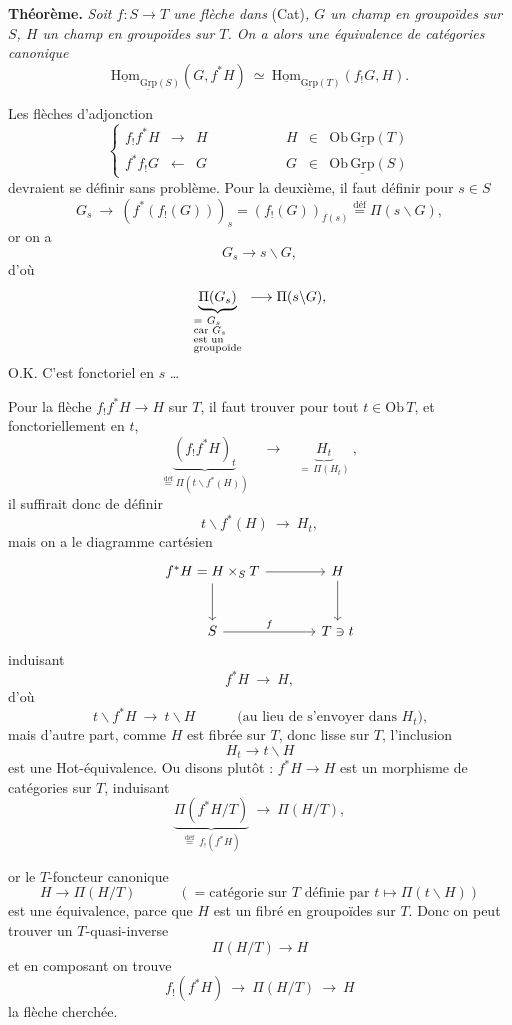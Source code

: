 \documentclass[11pt]{article}
\newcommand{\printedpage}[1]{\marginpar{\footnotesize p.~#1}}
\newcommand{\msp}[1]{\marginpar{\footnotesize [#1]}}
\newcommand{\uHom}{\underline{\mathrm{Hom}}}
\newcommand{\uGrp}{\underline{\mathrm{Grp}}}
\newcommand{\fl}{\longrightarrow}
\begin{document}
\printedpage{4}

\textbf{Théorème.} \textit{Soit $f : S \fl T$ une flèche dans} (Cat)\textit{, $G$ un champ en groupoïdes sur $S$, $H$ un champ en groupoïdes sur $T$. On a alors une équivalence de catégories canonique}
\[
\boxed{\ \uHom_{\uGrp(S)}(G, f^*H) \ \simeq\ \uHom_{\uGrp(T)}(f_!G, H).\ }
\]

Les flèches d'adjonction
\[
\left\{
\begin{array}{lclcrcl}
f_!f^*H & \fl & H & \qquad\qquad & H & \in & \mathrm{Ob}\,\uGrp(T)\\[4pt]
f^*f_!G & \longleftarrow & G & \qquad\qquad & G & \in & \mathrm{Ob}\,\uGrp(S)
\end{array}
\right.
\]
devraient se définir sans problème. Pour la deuxième, il faut définir pour $s \in S$
\[
G_s \ \fl\ (f^*(f_!(G)))_s = (f_!(G))_{f(s)} \overset{\text{déf}}{=} \Pi(s\backslash G),
\]
or on a
\[
G_s \fl s\backslash G,
\]
d'où
\[
\underbrace{\Pi(G_s)}_{\begin{subarray}{l} =\ G_s\\ \text{car } G_s\\ \text{est un}\\ \text{groupoïde}\end{subarray}} \ \fl \Pi(s\backslash G),
\]
O.K. C'est fonctoriel en $s$ \dots

\msp{page 5}
Pour la flèche $f_!f^*H \fl H$ sur $T$, il faut trouver pour tout $t \in \mathrm{Ob}\,T$, et fonctoriellement en $t$,
\[
\underbrace{(f_!f^*H)_t}_{\overset{\text{déf}}{=}\Pi(t\backslash f^*(H))} \quad \fl \quad \underbrace{H_t}_{=\,\Pi(H_t)} \ ,
\]
il suffirait donc de définir
\[
t\backslash f^*(H) \ \fl\ H_t,
\]
mais on a le diagramme cartésien
\[
\begin{tikzcd}[column sep=large, row sep=large]
f^*H = H \times_S T \arrow[r] \arrow[d] & H \arrow[d] \\
S \arrow[r, "f"] & T \ni t
\end{tikzcd}
\]
 induisant
\[
f^*H \ \fl\ H,
\]
\printedpage{5}
d'où
\[
t\backslash f^*H \ \fl\ t\backslash H \qquad\quad \text{(au lieu de s'envoyer dans $H_t$),}
\]
mais d'autre part, comme $H$ est fibrée sur $T$, donc lisse sur $T$, l'inclusion
\[
H_t \fl t\backslash H
\]
est une Hot-équivalence. Ou disons plutôt : $f^*H \fl H$ est un morphisme de catégories sur $T$, induisant
\[
\underbrace{\Pi(f^*H/T)}_{\overset{\text{déf}}{=}\ f_!(f^*H)} \ \fl\ \Pi(H/T),
\]

\msp{page 6}
or le $T$-foncteur canonique
\[
H \fl \Pi(H/T) \qquad\quad (= \text{catégorie sur } T \text{ définie par } t \longmapsto \Pi(t\backslash H))
\]
est une équivalence, parce que $H$ est un fibré en groupoïdes sur $T$. Donc on peut trouver un $T$-quasi-inverse
\[
\Pi(H/T) \fl H
\]
et en composant on trouve
\[
f_!(f^*H) \ \fl\ \Pi(H/T) \ \fl\ H
\]
la flèche cherchée.
\end{document}
